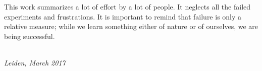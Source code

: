 This work summarizes a lot of effort by a lot of people. It neglects all the
failed experiments and frustrations. It is important to remind that failure is
only a relative measure; while we learn something either of nature or of
ourselves, we are being successful. 

\begin{flushright}
{\makeatletter\itshape
    \@firstname\ \@lastname \\
    Leiden, March 2017
\makeatother}
\end{flushright}

